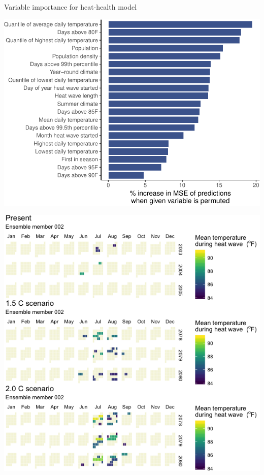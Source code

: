\documentclass[ignorenonframetext,]{beamer}
\begin{document}
\begin{frame}{Variable importance for heat-health model}

\begin{center}\includegraphics[height=0.85\textheight]{anderson_sees_2017_files/figure-beamer/unnamed-chunk-13-1} \end{center}

\end{frame}

\begin{frame}[plain]

\begin{center}\includegraphics[height=1.1\textheight]{HeatwaveCalendar} \end{center}

\end{frame}
\end{document}
